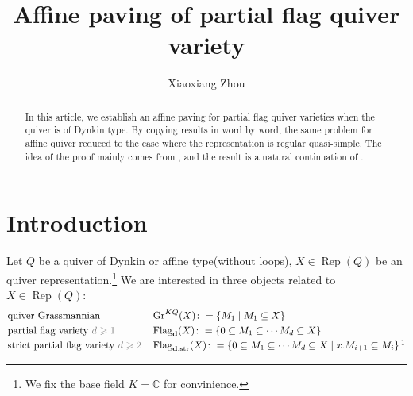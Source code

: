 \documentclass[reqno,11pt]{amsart}
\numberwithin{equation}{section}
\theoremstyle{plain}
\theoremstyle{plain}
\numberwithin{equation}{section}
\theoremstyle{remark}
\DeclareMathOperator{\Rep}{\operatorname{Rep}}
\DeclareMathOperator{\Flagd}{\operatorname{Flag}_{\mathbf{d}}}
\DeclareMathOperator{\Flagdstr}{\operatorname{Flag}_{\mathbf{d},str}}
\newcommand{\Grq}{\operatorname{Gr}^{KQ}}
\begin{document}
\date{}

\title
{Affine paving of partial flag quiver variety}


\author{Xiaoxiang Zhou}
\address{School of Mathematical Sciences\\
University of Bonn\\
Bonn, 53115\\ Germany\\} 





\begin{abstract}
In this article, we establish an affine paving for partial flag quiver varieties when the quiver is of Dynkin type. By copying results in \cite[section 6]{irelli2019cell} word by word, the same problem for affine quiver reduced to the case where the representation is regular quasi-simple. The idea of the proof mainly comes from \cite{irelli2019cell}, and the result is a natural continuation of \cite{maksimau2019flag}.
\end{abstract}



\maketitle
\tableofcontents

\section{Introduction}
Let $Q$ be a quiver of Dynkin or affine type(without loops), $X\in \Rep(Q)$ be an quiver representation.\footnote{We fix the base field $K=\mathbb{C}$ for convinience.} We are interested in three objects related to $X \in \Rep(Q)$:
\begin{equation*}
\begin{aligned}
&	\text{quiver Grassmannian} && \Grq(X)\colon = \left\{ M_1 \mid M_1 \subseteq X \right\}\\
&	\text{partial flag variety \textcolor{gray}{$d\geqslant 1$}} && \Flagd(X)\colon =\left\{ 0 \subseteq M_1 \subseteq \cdots M_d \subseteq X \right\}\\
&	\text{strict partial flag variety \textcolor{gray}{$d\geqslant 2$}} && \Flagdstr(X)\colon =\left\{ 0 \subseteq M_1 \subseteq \cdots M_d \subseteq X  \mid x.M_{i+1} \subseteq M_i\right\}\footnotemark\\
\end{aligned}
\end{equation*}
\end{document}
